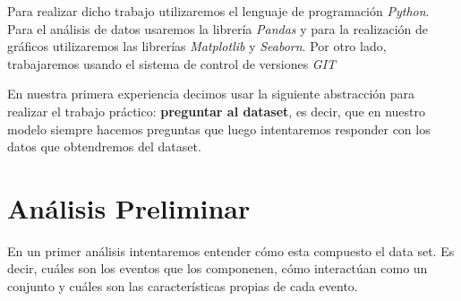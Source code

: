 \documentclass[titlepage,a4paper]{article}
\begin{document}
	Para realizar dicho trabajo utilizaremos el lenguaje de programación \textit{Python}. Para el análisis de datos usaremos la librería \textit{Pandas} y para la realización de gráficos utilizaremos las librerías \textit{Matplotlib }y \textit{Seaborn}. Por otro lado, trabajaremos usando el sistema de control de versiones \textit{GIT}	
	
	En nuestra primera experiencia decimos usar la siguiente abstracción para realizar el trabajo práctico: \textbf{preguntar al dataset}, es decir, que en nuestro modelo siempre hacemos preguntas que luego intentaremos responder con los datos que obtendremos del dataset. 
	
	\section{Análisis Preliminar}
	En un primer análisis intentaremos entender cómo esta compuesto el data set. Es decir, cuáles son los eventos que los componenen, cómo interactúan como un conjunto y cuáles son las características propias de cada evento. 
\end{document}
